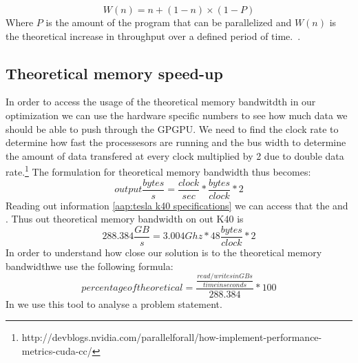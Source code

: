 \begin{equation}
  \label{eq:gustafson-barsis law}
  W(n) = n + (1-n) \times (1-P)
\end{equation}
Where $P$ is the amount of the program that can be parallelized and $W(n)$ is the theoretical increase in throughput over a defined period of time.~\cite{gustafson1988reevaluating}.


\subsection{Theoretical memory speed-up}
\label{sec:analysing hardware}
In order to access the usage of the theoretical memory bandwitdth in our optimization we can use the hardware specific numbers to see how much data we should be able to push through the GPGPU.
We need to find the clock rate to determine how fast the processesors are running and the bus width to determine the amount of data transfered at every clock multiplied by 2 due to double data rate.\footnote{http://devblogs.nvidia.com/parallelforall/how-implement-performance-metrics-cuda-cc/}
The formulation for theoretical memory bandwidth thus becomes:
\begin{equation*}
output \frac{bytes}{s} = \frac{clock}{sec} * \frac{bytes}{clock} * 2
\end{equation*}
Reading out  information \cref{aap:tesla k40 specifications} we can access that the  and .
Thus out theoretical memory bandwidth on out K40 is
\begin{equation*}
288.384 \frac{GB}{s} = 3.004 Ghz * 48 \frac{bytes}{clock} * 2
\end{equation*}
In order to understand how close our solution is to the theoretical memory bandwidthwe use the following formula:
\begin{equation*}
percentage of theoretical = \frac{\frac{read/writes in GBs}{time in seconds}}{288.384} * 100
\end{equation*}
In  we use this tool to analyse a problem statement.
